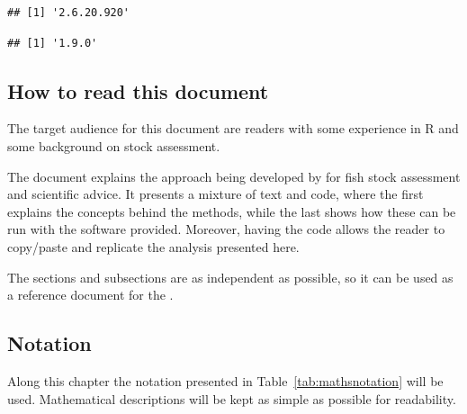 \documentclass[a4paper,english,11pt]{article}
\begin{document}
\begin{knitrout}
\color{fgcolor}\begin{kframe}
\begin{alltt}
\hldef{(}\hldef{)}
\end{alltt}
\begin{verbatim}
## [1] '2.6.20.920'
\end{verbatim}
\begin{alltt}
\hldef{(}\hldef{)}
\end{alltt}
\begin{verbatim}
## [1] '1.9.0'
\end{verbatim}
\end{kframe}
\end{knitrout}

\subsection{How to read this document}

The target audience for this document are readers with some experience in R and some background on stock assessment.

The document explains the approach being developed by \aFa for fish stock assessment and scientific advice. It presents a mixture of text and code, where the first explains the concepts behind the methods, while the last shows how these can be run with the software provided. Moreover, having the code allows the reader to copy/paste and replicate the analysis presented here.

The sections and subsections are as independent as possible, so it can be used as a reference document for the . 

\subsection{Notation}

Along this chapter the notation presented in Table~\ref{tab:mathsnotation} will be used. Mathematical descriptions will be kept as simple as possible for readability.
\end{document}
